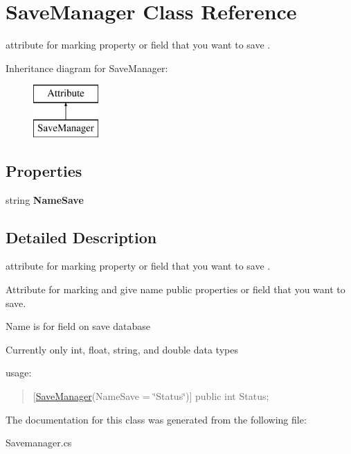 \hypertarget{class_save_manager}{}\section{Save\+Manager Class Reference}
\label{class_save_manager}


attribute for marking property or field that you want to save .  


Inheritance diagram for Save\+Manager\+:\begin{figure}[H]
\begin{center}
\leavevmode
\includegraphics[height=2.000000cm]{class_save_manager}
\end{center}
\end{figure}
\subsection*{Properties}
\begin{DoxyCompactItemize}
\item 
\mbox{\label{class_save_manager_a43e7c0b8ede3057239a0f76122759550}} 
string {\bfseries Name\+Save}
\end{DoxyCompactItemize}


\subsection{Detailed Description}
attribute for marking property or field that you want to save . 


\begin{DoxyItemize}
\item Attribute for marking and give name public properties or field that you want to save.
\item Name is for field on save database
\item Currently only int, float, string, and double data types

usage\+: \begin{quote}
\mbox{[}\mbox{\hyperlink{class_save_manager}{Save\+Manager}}(Name\+Save = \char`\"{}\+Status\char`\"{})\mbox{]} public int Status;\end{quote}

\end{DoxyItemize}

The documentation for this class was generated from the following file\+:\begin{DoxyCompactItemize}
\item 
Savemanager.\+cs\end{DoxyCompactItemize}
